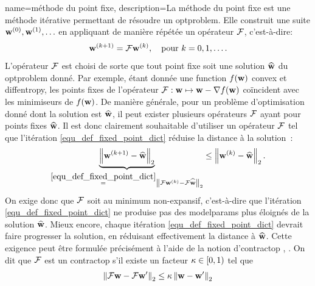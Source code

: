 {name={méthode du point fixe},
	description={La  méthode du point fixe est une méthode itérative 
		permettant de résoudre un \gls{optproblem}. Elle construit une suite \( {\bf w}^{(0)}, {\bf w}^{(1)}, \ldots \) 
		en appliquant de manière répétée un opérateur \( \mathcal{F} \), c’est-à-dire:
		\begin{equation} 
			\label{equ_def_fixed_point_dict} 
			{\bf w}^{(k+1)} = \mathcal{F} {\bf w}^{(k)}, \quad \text{pour } k = 0, 1, \ldots.
		\end{equation} 
		L’opérateur \( \mathcal{F} \) est choisi de sorte que tout point fixe soit une solution 
		\( \widehat{{\bf w}} \) du \gls{optproblem} donné. Par exemple, étant donnée une \gls{function} \( f({\bf w}) \) \gls{convex} et 
		\gls{diffentropy}, les points fixes de l’opérateur 
		\( \mathcal{F}: {\bf w} \mapsto {\bf w} - \nabla f({\bf w}) \) coïncident avec les minimiseurs de \( f({\bf w}) \).
		De manière générale, pour un problème d’optimisation donné dont la solution est \( \widehat{{\bf w}} \), 
		il peut exister plusieurs opérateurs \( \mathcal{F} \) ayant pour points fixes \( \widehat{{\bf w}} \). 
		Il est donc clairement souhaitable d’utiliser un opérateur \( \mathcal{F} \) tel que l’itération 
		\eqref{equ_def_fixed_point_dict} réduise la distance à la solution :
		\begin{equation}
			\nonumber
			\underbrace{\left\Vert { {\bf w}^{(k+1)} - \widehat{\mathbf{w}}} \right\Vert_{2}}_{\stackrel{\eqref{equ_def_fixed_point_dict}}{=} 
				\left\Vert { \mathcal{F}{\bf w}^{(k)} - \mathcal{F}\widehat{{\bf w}}} \right\Vert_{2}}  \leq 
			\left\Vert { {\bf w}^{(k)} - \widehat{{\bf w}}} \right\Vert_{2}.
		\end{equation}
		On exige donc que \( \mathcal{F} \) soit au minimum non-expansif, c’est-à-dire que l’itération 
		\eqref{equ_def_fixed_point_dict} ne produise pas des \gls{modelparams} plus éloignés de la solution 
		\( \widehat{{\bf w}} \).
		Mieux encore, chaque itération \eqref{equ_def_fixed_point_dict} devrait faire progresser la solution, 
		en réduisant effectivement la distance à \( \widehat{{\bf w}} \). Cette exigence peut être formulée 
		précisément à l’aide de la notion d’\gls{contractop} \cite{Bauschke:2017}, \cite{fixedpoinIsta}. 
		On dit que \( \mathcal{F} \) est un \gls{contractop} s’il existe un facteur \( \kappa \in [0,1) \) tel que
		\begin{equation}
			\nonumber
			\normgeneric{ \fixedpointop \weights - \fixedpointop \weights'}{2}  \leq  \contractfac \normgeneric{\weights - \weights'}{2} 

\end{equation}}}
